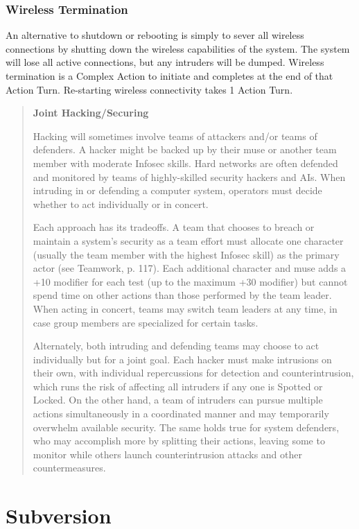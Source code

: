 \subsubsection{Wireless Termination}

An alternative to shutdown or rebooting is simply to 
sever all wireless connections by shutting down the 
wireless capabilities of the system. The system will 
lose all active connections, but any intruders will be 
dumped. Wireless termination is a Complex Action to 
initiate and completes at the end of that Action Turn. 
Re-starting wireless connectivity takes 1 Action Turn.

\begin{quotation}
\textbf{Joint Hacking/Securing}

Hacking will sometimes involve teams of attackers
and/or teams of defenders. A hacker might
be backed up by their muse or another team
member with moderate Infosec skills. Hard
networks are often defended and monitored
by teams of highly-skilled security hackers and
AIs. When intruding in or defending a computer
system, operators must decide whether to act
individually or in concert.

Each approach has its tradeoffs. A team that
chooses to breach or maintain a system’s security
as a team effort must allocate one character (usually
the team member with the highest Infosec
skill) as the primary actor (see Teamwork, p. 117).
Each additional character and muse adds a +10
modifier for each test (up to the maximum +30
modifier) but cannot spend time on other actions
than those performed by the team leader. When
acting in concert, teams may switch team leaders
at any time, in case group members are specialized
for certain tasks.

Alternately, both intruding and defending
teams may choose to act individually but for a
joint goal. Each hacker must make intrusions
on their own, with individual repercussions for
detection and counterintrusion, which runs the
risk of affecting all intruders if any one is Spotted
or Locked. On the other hand, a team of intruders
can pursue multiple actions simultaneously in
a coordinated manner and may temporarily overwhelm
available security. The same holds true for
system defenders, who may accomplish more by
splitting their actions, leaving some to monitor
while others launch counterintrusion attacks and
other countermeasures.
\end{quotation}


\section{Subversion}

